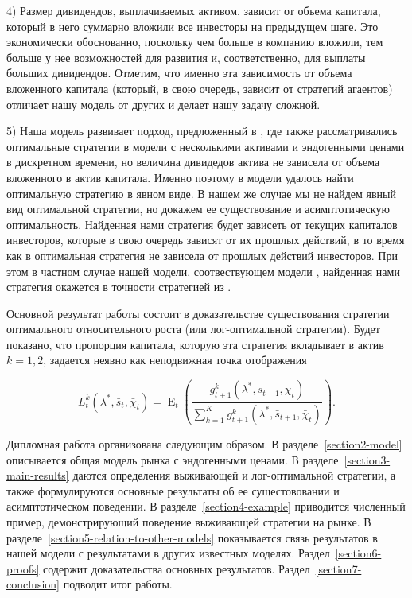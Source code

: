 \documentclass[a4paper,12pt,russian]{article} %
\theoremstyle{definition}
\DeclareMathOperator{\E}{E}
\begin{document}
4) Размер дивидендов, выплачиваемых активом, зависит от объема капитала, который в него суммарно вложили все инвесторы на предыдущем шаге. Это экономически обоснованно, поскольку чем больше в компанию вложили, тем больше у нее возможностей для развития и, соответственно, для выплаты больших дивидендов. Отметим, что именно эта зависимость от объема вложенного капитала (который, в свою очередь, зависит от стратегий агаентов) отличает нашу модель от других и делает нашу задачу сложной.

5) Наша модель развивает подход, предложенный в \cite{Amir2013}, где также рассматривались оптимальные стратегии в модели с несколькими активами и эндогенными ценами в дискретном времени, но величина дивидедов актива не зависела от объема вложенного в актив капитала.
Именно поэтому в модели \cite{Amir2013} удалось найти оптимальную стратегию в явном виде.
В нашем же случае мы не найдем явный вид оптимальной стратегии, но докажем ее существование и асимптотическую оптимальность. Найденная нами стратегия 
будет зависеть от текущих капиталов инвесторов, которые в свою очередь зависят от их прошлых действий, в то время как в \cite{Amir2013} оптимальная стратегия не зависела
от прошлых действий инвесторов. При этом в частном случае нашей модели, соотвествующем модели \cite{Amir2013}, найденная нами стратегия окажется в точности стратегией из \cite{Amir2013}.

Основной результат работы состоит в доказательстве существования 
стратегии оптимального относительного роста (или лог-оптимальной стратегии). 
Будет показано, что пропорция капитала, которую эта стратегия вкладывает 
в актив $k=1,2$, задается неявно как неподвижная точка отображения

\begin{equation*}
    L_{t}^k(\lambda^*, \bar s_t,\bar\chi_t) 
= \E_t\left(
  \frac{g_{t+1}^k(\lambda^*,\bar s_{t+1},\bar\chi_t)}
       {\sum_{k=1}^K g_{t+1}^k(\lambda^*,\bar s_{t+1},\bar\chi_t)} 
  \right).
\end{equation*}



Дипломная работа организована следующим образом. В разделе~\ref{section2-model} описывается
общая модель рынка с эндогенными ценами. В разделе~\ref{section3-main-results} даются определения выживающей и лог-оптимальной стратегии, а также формулируются основные результаты об ее сущестововании и асимптотическом поведении. В разделе~\ref{section4-example} приводится численный пример, демонстрирующий поведение выживающей стратегии на рынке. В разделе~\ref{section5-relation-to-other-models} показывается связь результатов в нашей модели с результатами в других известных моделях. Раздел~\ref{section6-proofs} содержит доказательства основных результатов. Раздел~\ref{section7-conclusion} подводит итог работы.
\end{document}
